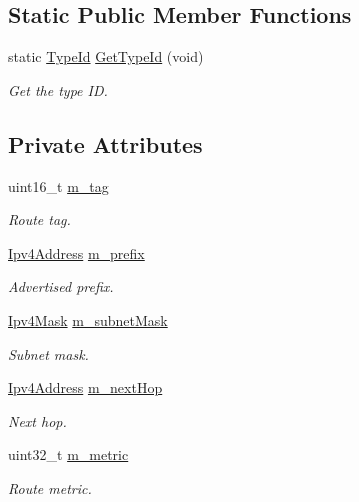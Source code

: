 \subsection*{Static Public Member Functions}
\begin{DoxyCompactItemize}
\item 
static \hyperlink{classns3_1_1TypeId}{Type\+Id} \hyperlink{classns3_1_1RipRte_ad059bc59ecb6c0b2c52384645914dd7a}{Get\+Type\+Id} (void)
\begin{DoxyCompactList}\small\item\em Get the type ID. \end{DoxyCompactList}\end{DoxyCompactItemize}
\subsection*{Private Attributes}
\begin{DoxyCompactItemize}
\item 
uint16\+\_\+t \hyperlink{classns3_1_1RipRte_a3556685480286d998bef7ba75a91be53}{m\+\_\+tag}
\begin{DoxyCompactList}\small\item\em Route tag. \end{DoxyCompactList}\item 
\hyperlink{classns3_1_1Ipv4Address}{Ipv4\+Address} \hyperlink{classns3_1_1RipRte_a12719ecd898e44211875a9300b90ee48}{m\+\_\+prefix}
\begin{DoxyCompactList}\small\item\em Advertised prefix. \end{DoxyCompactList}\item 
\hyperlink{classns3_1_1Ipv4Mask}{Ipv4\+Mask} \hyperlink{classns3_1_1RipRte_a18df7fed0765990054dfb50c13d45ecf}{m\+\_\+subnet\+Mask}
\begin{DoxyCompactList}\small\item\em Subnet mask. \end{DoxyCompactList}\item 
\hyperlink{classns3_1_1Ipv4Address}{Ipv4\+Address} \hyperlink{classns3_1_1RipRte_acfd889bde12da51327722f07a501bcb9}{m\+\_\+next\+Hop}
\begin{DoxyCompactList}\small\item\em Next hop. \end{DoxyCompactList}\item 
uint32\+\_\+t \hyperlink{classns3_1_1RipRte_a15971fca4104f1b10985202014a90895}{m\+\_\+metric}
\begin{DoxyCompactList}\small\item\em Route metric. \end{DoxyCompactList}\end{DoxyCompactItemize}
